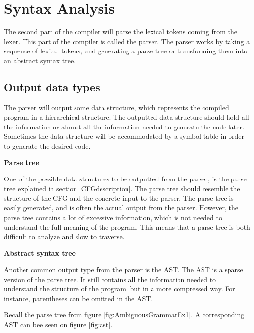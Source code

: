 \section{Syntax Analysis}

The second part of the compiler will parse the lexical tokens coming from the lexer. 
This part of the compiler is called the parser. 
The parser works by taking a sequence of lexical tokens, and generating a parse tree or transforming them into an abstract syntax tree. 

\subsection{Output data types}

The parser will output some data structure, which represents the compiled program in a hierarchical structure. 
The outputted data structure should hold all the information or almost all the information needed to generate the code later. 
Sometimes the data structure will be accommodated by a symbol table in order to generate the desired code.

\textbf{Parse tree}

One of the possible data structures to be outputted from the parser, is the parse tree explained in section \ref{CFGdescription}. 
The parse tree should resemble the structure of the CFG and the concrete input to the parser. 
The parse tree is easily generated, and is often the actual output from the parser. 
However, the parse tree contains a lot of excessive information, which is not needed to understand the full meaning of the program. 
This means that a parse tree is both difficult to analyze and slow to traverse. 

\textbf{Abstract syntax tree}

Another common output type from the parser is the AST.
The AST is a sparse version of the parse tree. 
It still contains all the information needed to understand the structure of the program, but in a more compressed way. 
For instance, parentheses can be omitted in the AST.

Recall the parse tree from figure \ref{fig:AmbiguousGrammarEx1}. 
A corresponding AST can bee seen on figure \ref{fig:ast}.

